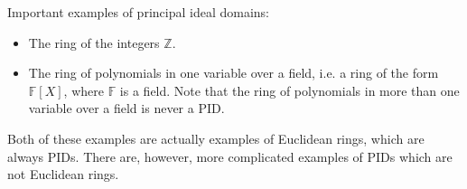 \documentclass[12pt]{article}
\begin{document}
Important examples of principal ideal domains:

\begin{itemize}
\item The ring of the integers $\mathbb Z$.
\item The ring of polynomials in one variable over a field, i.e. a ring of
the form $\mathbb F[X]$, where $\mathbb F$ is a field. Note that the ring of polynomials in more than one variable over a field is never a PID.
\end{itemize}

Both of these examples are actually examples of Euclidean rings, which are 
always PIDs. There are, however, more complicated examples of PIDs which are
not Euclidean rings.
\end{document}
